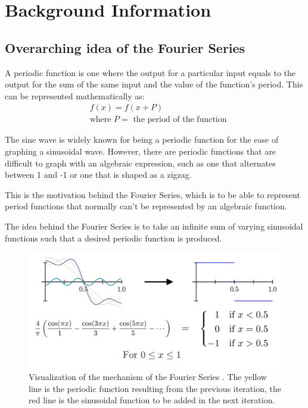 \documentclass[letterpaper, 12pt]{article}
\begin{document}
\section{Background Information}

\subsection{Overarching idea of the Fourier Series}

A periodic function is one where the output for a particular input equals to
the output for the sum of the same input and the value of the function's period.
This can be represented mathematically as:
\begin{align*}
     & f(x) = f(x + P)
    \\
     & \text{where } P = \text{ the period of the function}
\end{align*}

The sine wave is widely known for being a periodic function for the ease of graphing
a sinusoidal wave. However, there are periodic functions that are difficult to
graph with an algebraic expression, such as one that alternates between
1 and -1 or one that is shaped as a zigzag.

This is the motivation behind the Fourier Series, which is to be able to represent
period functions that normally can't be represented by an algebraic function.

The idea behind the Fourier Series is to take an infinite sum of varying sinusoidal
functions such that a desired periodic function is produced.

\begin{figure}[H]
    \centering
    \includegraphics[width=\textwidth]{fourier_basic_visual.png}
    \caption{Visualization of the mechanism of the Fourier Series \protect\cite{sandersonWhatFourierSeries2019}. The yellow line is the periodic function resulting from the previous iteration, the red line is the sinusoidal function to be added in the next iteration.}
    \label{fig:fourier_visual}
\end{figure}
\end{document}
